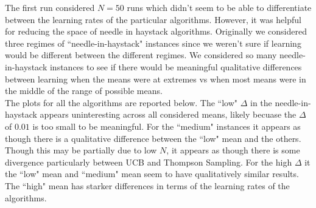 \documentclass[11pt,letterpaper]{article}
\begin{document}
The first run considered $N=50$ runs which didn't seem to be able to differentiate between the learning rates of the particular algorithms. However, it was helpful for reducing the space of needle in haystack algorithms. Originally we considered three regimes of ``needle-in-haystack" instances since we weren't sure if learning would be different between the different regimes. We considered so many needle-in-haystack instances to see if there would be meaningful qualitative differences between learning when the means were at extremes vs when most means were in the middle of the range of possible means. \\

The plots for all the algorithms are reported below. The ``low" $\Delta$ in the needle-in-haystack appears uninteresting across all considered means, likely becuase the $\Delta$ of $0.01$ is too small to be meaningful. For the ``medium" instances it appears as though there is a qualitative difference between the ``low" mean and the others. Though this may be partially due to low $N$, it appears as though there is some divergence particularly between UCB and Thompson Sampling. For the high $\Delta$ it the ``low" mean and ``medium" mean seem to have qualitatively similar results. The ``high" mean has starker differences in terms of the learning rates of the algorithms.
\end{document}
